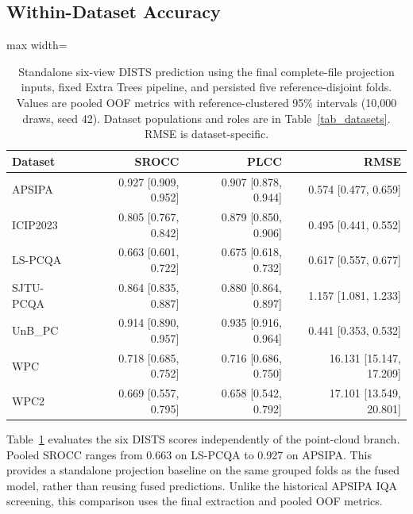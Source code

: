 \documentclass[final,3p,times,twocolumn]{elsarticle}
\begin{document}
\subsection{Within-Dataset Accuracy} \label{sec_results_pointpcapp_sota}

\begin{table}[t!]
    \centering
    \caption{Standalone six-view \gls{DISTS} prediction using the final complete-file projection inputs, fixed Extra Trees pipeline, and persisted five reference-disjoint folds. Values are pooled \gls{OOF} metrics with reference-clustered 95\% intervals (10,000 draws, seed 42). Dataset populations and roles are in Table~\ref{tab_datasets}. RMSE is dataset-specific.}
    \label{tab_review_projection_only}
    \scriptsize
    \begin{adjustbox}{max width=\textwidth}
        \begin{tabular}{lrrr}
        \toprule
        Dataset & SROCC & PLCC & RMSE \\
        \midrule
        APSIPA & 0.927 [0.909, 0.952] & 0.907 [0.878, 0.944] & 0.574 [0.477, 0.659] \\
        ICIP2023 & 0.805 [0.767, 0.842] & 0.879 [0.850, 0.906] & 0.495 [0.441, 0.552] \\
        LS-PCQA & 0.663 [0.601, 0.722] & 0.675 [0.618, 0.732] & 0.617 [0.557, 0.677] \\
        SJTU-PCQA & 0.864 [0.835, 0.887] & 0.880 [0.864, 0.897] & 1.157 [1.081, 1.233] \\
        UnB\_PC & 0.914 [0.890, 0.957] & 0.935 [0.916, 0.964] & 0.441 [0.353, 0.532] \\
        WPC & 0.718 [0.685, 0.752] & 0.716 [0.686, 0.750] & 16.131 [15.147, 17.209] \\
        WPC2 & 0.669 [0.557, 0.795] & 0.658 [0.542, 0.792] & 17.101 [13.549, 20.801] \\
        \bottomrule
        \end{tabular}
    \end{adjustbox}
\end{table}


Table~\ref{tab_review_projection_only} evaluates the six \gls{DISTS} scores independently of the point-cloud branch. Pooled SROCC ranges from 0.663 on LS-PCQA to 0.927 on APSIPA. This provides a standalone projection baseline on the same grouped folds as the fused model, rather than reusing fused predictions. Unlike the historical APSIPA IQA screening, this comparison uses the final extraction and pooled OOF metrics.
\end{document}

